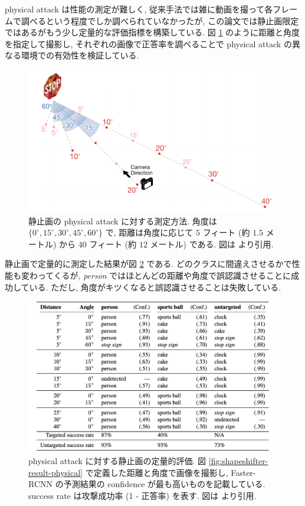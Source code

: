 physical attack は性能の測定が難しく, 従来手法では雑に動画を撮って各フレームで調べるという程度でしか調べられていなかったが, この論文では静止画限定ではあるがもう少し定量的な評価指標を構築している.
図 \ref{fig:shapeshifter-measurement} のように距離と角度を指定して撮影し, それぞれの画像で正答率を調べることで physical attack の異なる環境での有効性を検証している.
%
\begin{figure}[htbp]
\begin{center}
\includegraphics[width=12.0cm]{figures/shapeshifter-measurement.pdf}
\end{center}
\caption{
静止画の physical attack に対する測定方法.
角度は $\{0^{\circ}, 15^{\circ}, 30^{\circ}, 45^{\circ}, 60^{\circ}\}$ で, 距離は角度に応じて $5$ フィート (約 $1.5$ メートル) から $40$ フィート (約 $12$ メートル) である.
図は \cite{chen2018shapeshifter} より引用.
}
\label{fig:shapeshifter-measurement}
\end{figure}
%

静止画で定量的に測定した結果が図 \ref{fig:shapeshifter-result-table} である.
どのクラスに間違えさせるかで性能も変わってくるが, {\it person} ではほとんどの距離や角度で誤認識させることに成功している.
ただし, 角度がキツくなると誤認識させることは失敗している.
%
\begin{figure}[htbp]
\begin{center}
\includegraphics[width=14.0cm]{figures/shapeshifter-result-table.pdf}
\end{center}
\caption{
physical attack に対する静止画の定量的評価.
図 \ref{fig:shapeshifter-result-physical} で定義した距離と角度で画像を撮影し, Faster-RCNN の予測結果の confidence が最も高いものを記載している.
success rate は攻撃成功率 (1 - 正答率) を表す.
図は \cite{chen2018shapeshifter} より引用.
}
\label{fig:shapeshifter-result-table}
\end{figure}
%

